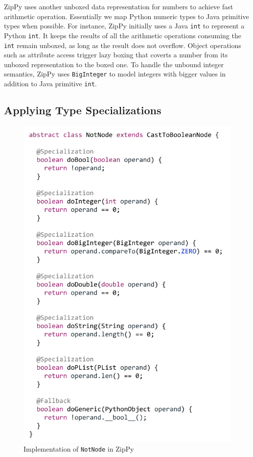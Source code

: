 ZipPy uses another unboxed data representation for numbers to achieve fast arithmetic operation.
Essentially we map Python numeric types to Java primitive types when possible.
For instance, ZipPy initially uses a Java \texttt{int} to represent a Python \texttt{int}.
It keeps the results of all the arithmetic operations consuming the \texttt{int} remain unboxed, as long as the result does not overflow.
Object operations such as attribute access trigger lazy boxing that coverts a number from its unboxed representation to the boxed one.
To handle the unbound integer semantics, ZipPy uses \texttt{BigInteger} to model integers with bigger values in addition to Java primitive \texttt{int}.

\subsection{Applying Type Specializations}

\begin{figure}[t]
\centering
\includegraphics[scale=.9]{figures/ch3-not-node-code.pdf}
\caption{Implementation of \texttt{NotNode} in ZipPy}
\label{fig:not-node-code}
\end{figure}


